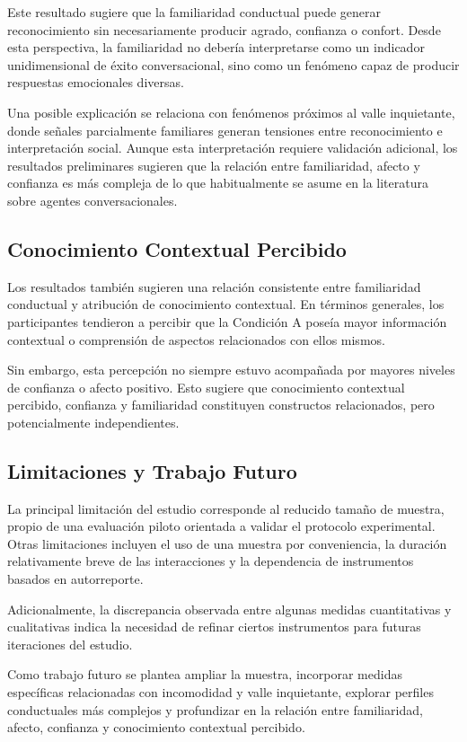 \documentclass[sigconf, nonacm, language=spanish]{acmart}
\begin{document}
Este resultado sugiere que la familiaridad conductual puede generar reconocimiento sin necesariamente producir agrado, confianza o confort. Desde esta perspectiva, la familiaridad no debería interpretarse como un indicador unidimensional de éxito conversacional, sino como un fenómeno capaz de producir respuestas emocionales diversas.

Una posible explicación se relaciona con fenómenos próximos al valle inquietante, donde señales parcialmente familiares generan tensiones entre reconocimiento e interpretación social. Aunque esta interpretación requiere validación adicional, los resultados preliminares sugieren que la relación entre familiaridad, afecto y confianza es más compleja de lo que habitualmente se asume en la literatura sobre agentes conversacionales.

\subsection{Conocimiento Contextual Percibido}

Los resultados también sugieren una relación consistente entre familiaridad conductual y atribución de conocimiento contextual. En términos generales, los participantes tendieron a percibir que la Condición A poseía mayor información contextual o comprensión de aspectos relacionados con ellos mismos.

Sin embargo, esta percepción no siempre estuvo acompañada por mayores niveles de confianza o afecto positivo. Esto sugiere que conocimiento contextual percibido, confianza y familiaridad constituyen constructos relacionados, pero potencialmente independientes.

\subsection{Limitaciones y Trabajo Futuro}

La principal limitación del estudio corresponde al reducido tamaño de muestra, propio de una evaluación piloto orientada a validar el protocolo experimental. Otras limitaciones incluyen el uso de una muestra por conveniencia, la duración relativamente breve de las interacciones y la dependencia de instrumentos basados en autorreporte.

Adicionalmente, la discrepancia observada entre algunas medidas cuantitativas y cualitativas indica la necesidad de refinar ciertos instrumentos para futuras iteraciones del estudio.

Como trabajo futuro se plantea ampliar la muestra, incorporar medidas específicas relacionadas con incomodidad y valle inquietante, explorar perfiles conductuales más complejos y profundizar en la relación entre familiaridad, afecto, confianza y conocimiento contextual percibido.


\newpage


\end{document}
